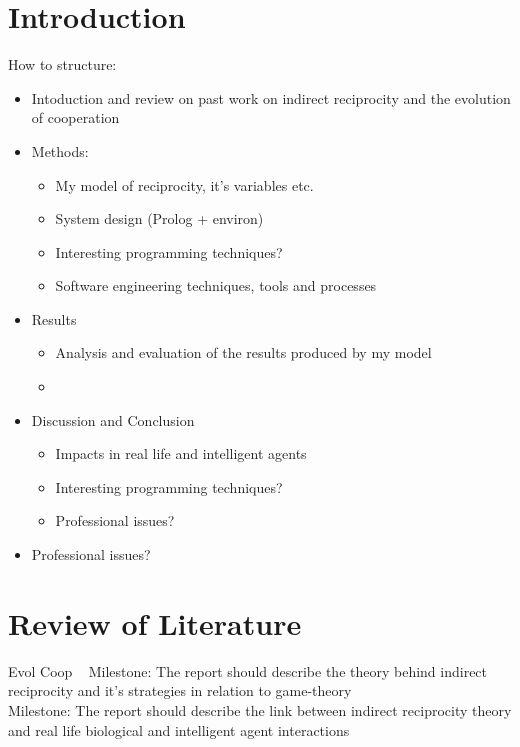 \chapter{Introduction}
How to structure:\\
\begin{itemize}
	\item Intoduction and review on past work on indirect reciprocity and the evolution of cooperation
	\item Methods: 
	\begin{itemize}
		\item My model of reciprocity, it's variables etc.
		\item System design (Prolog + environ)
		\item Interesting programming techniques?
		\item Software engineering techniques, tools and processes
	\end{itemize}
	\item Results
	\begin{itemize}
		\item Analysis and evaluation of the results produced by my model
		\item 
	\end{itemize}
	\item Discussion and Conclusion
	\begin{itemize}
		\item Impacts in real life and intelligent agents
		\item Interesting programming techniques?
		\item Professional issues?
	\end{itemize}
	\item Professional issues?
\end{itemize}

\chapter{Review of Literature}
Evol Coop ~\cite{evolution_of_cooperation}
Milestone: The report should describe the theory behind indirect reciprocity and it’s strategies in relation to game-theory\\
Milestone: The report should describe the link between indirect reciprocity theory and real life biological and intelligent agent interactions\\


